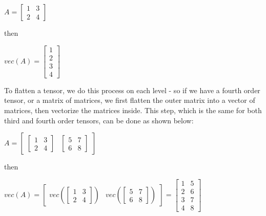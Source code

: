 \documentclass[twocolumn,10pt]{asme2ej}
\begin{document}
\bigskip
\begin{center}
$A = \begin{bmatrix} 1 & 3 \\ 2 & 4 \end{bmatrix}$
\end{center}

then

\begin{center}
$vec(A) = \begin{bmatrix} 1 \\ 2 \\ 3 \\ 4 \end{bmatrix}$
\end{center}

To flatten a tensor, we do this process on each level - so if we have a fourth order tensor, or a matrix of matrices, we first flatten the outer matrix into a vector of matrices, then vectorize the matrices inside. This step, which is the same for both third and fourth order tensors, can be done as shown below:

\bigskip
\begin{center}
$A = \begin{bmatrix} \begin{bmatrix} 1 & 3 \\ 2 & 4 \end{bmatrix} & \begin{bmatrix} 5 & 7 \\ 6 & 8 \end{bmatrix} \end{bmatrix}$
\end{center}

then

\begin{center}
$vec(A) = \begin{bmatrix} vec(\begin{bmatrix} 1 & 3 \\ 2 & 4 \end{bmatrix}) & vec(\begin{bmatrix} 5 & 7 \\ 6 & 8 \end{bmatrix}) \end{bmatrix} = \begin{bmatrix} 1 & 5 \\ 2 & 6 \\ 3 & 7 \\ 4 & 8 \end{bmatrix}$
\end{center}
\end{document}
